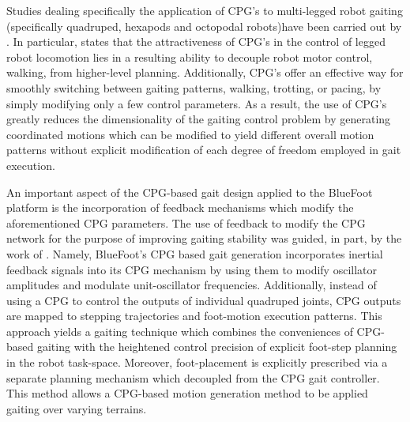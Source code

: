 		Studies dealing specifically the application of CPG's to multi-legged robot gaiting (specifically quadruped, hexapods and octopodal robots)have been carried out by \cite{Arena2001,Klaasan2002,Arena2004,Inagaki2003,Inagaki2006,Billard2000,Brambilla2006,Buchli2006,Tsujita2001,Tsujita2004}.  In particular, \cite{Ijspeert2008} states that the attractiveness of CPG's in the control of legged robot locomotion lies in a resulting ability to decouple robot motor control, \IE walking, from higher-level planning. Additionally, CPG's offer an effective way for smoothly switching between gaiting patterns, \EG walking, trotting, or pacing, by simply modifying only a few control parameters. As a result, the use of CPG's greatly reduces the dimensionality of the gaiting control problem by generating coordinated motions which can be modified to yield different overall motion patterns without explicit modification of each degree of freedom employed in gait execution.

		An important aspect of the CPG-based gait design applied to the BlueFoot platform is the incorporation of feedback mechanisms which modify the aforementioned CPG parameters. The use of feedback to modify the CPG network for the purpose of improving gaiting stability was guided, in part, by the work of \cite{Fukuoka2003,Endo2004}. Namely, BlueFoot's CPG based gait generation incorporates inertial feedback signals into its CPG mechanism by using them to modify oscillator amplitudes and modulate unit-oscillator frequencies. Additionally, instead of using a CPG to control the outputs of individual quadruped joints, CPG outputs are mapped to stepping trajectories and foot-motion execution patterns. This approach yields a gaiting technique which combines the conveniences of CPG-based gaiting with the heightened control precision of explicit foot-step planning in the robot task-space. Moreover, foot-placement is explicitly prescribed via a separate planning mechanism which decoupled from the CPG gait controller. This method allows a CPG-based motion generation method to be applied gaiting over varying terrains.

